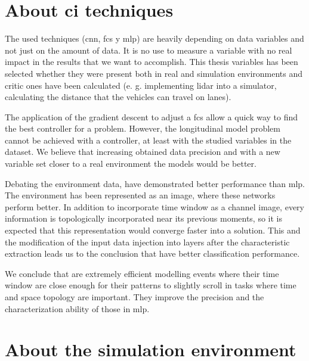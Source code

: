 \section{About \acrlong{ci} techniques}

The used techniques (\acrlong{cnn}, \acrlong{fcs} y \acrlong{mlp}) are heavily depending on data variables and not just on the amount of data. It is no use to measure a variable with no real impact in the results that we want to accomplish. This thesis variables has been selected whether they were present both in real and simulation environments and critic ones have been calculated (e. g. implementing \acrshort{lidar} into a simulator, calculating the distance that the vehicles can travel on lanes).

The application of the gradient descent to adjust a \acrlong{fcs} allow a quick way to find the best controller for a problem. However, the longitudinal model problem cannot be achieved with a controller, at least with the studied variables in the dataset. We believe that increasing obtained data precision and with a new variable set closer to a real environment the models would be better.

Debating the environment data,  have demonstrated better performance than \acrlong{mlp}. The environment has been represented as an image, where these networks perform better. In addition to incorporate time window as a channel image, every information is topologically incorporated near its previous moments, so it is expected that this representation would converge faster into a solution. This and the modification of the input data injection into layers after the characteristic extraction leads us to the conclusion that  have better classification performance.

We conclude that  are extremely efficient modelling events where their time window are close enough for their patterns to slightly scroll in tasks where time and space topology are important. They improve the precision and the characterization ability of those in \acrlong{mlp}.

\section{About the simulation environment}

